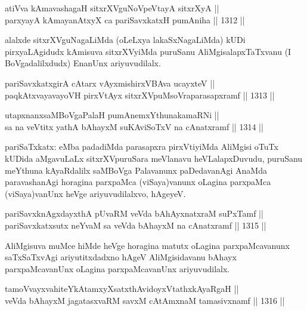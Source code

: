 \begin{shl}
atiVva kAmavashagaH sitxrXVguNoVpeVtayA sitxrXyA || \\
parxyayA kAmayanAtxyX ca pariSavxkatxH pumAniha \hfill || 1312 ||  
\end{shl}

\begin{artha}
alalxde sitxrXVguNagaLiMda (oLeLxya lakaSxNagaLiMda) kUDi pirxyaLAgidudx kAmisuva sitxrXVyiMda puruSanu AliMgisalapxTaTxvanu (I BoVgadalilxdudx) EnanUnx ariyuvudilalx.
\end{artha}


\begin{shl}
pariSavxkatxgirA cAtarx vAyxmishirxVBAva ucayxteV || \\
paqkAtxvayavayoVH pirxVtAyx sitxrXVpuMsoVraparasapxramf \hfill || 1313 ||  
\end{shl}
				
\begin{shl}
utapxnanxsaMBoVgaPalaH pumAnemxYthunakamaRNi || \\
sa na veVtitx yathA bAhayxM suKAviSoTxV na cA\s \s natxramf \hfill || 1314 ||  
\end{shl}

\begin{artha}
pariSaTxkatx: eMba padadiMda parasapxra pirxVtiyiMda AliMgisi oTuTx kUDida aMgavuLaLx sitxrXVpuruSara meVlanavu heVLalapxDuvudu, puruSanu meYthuna kAyaRdalilx saMBoVga Palavanunx paDedavanAgi AnaMda paravashanAgi horagina parxpaMca (viSaya)vanunx oLagina parxpaMca (viSaya)vanUnx heVge ariyuvudilalxvo, hAgeyeV.
\end{artha}

\begin{shl}
pariSavxknAgxdayxthA pUvaRM veVda bAhAyxnatxraM suPxTamf || \\
pariSavxkatxsutx neYvaM sa veVda bAhayxM na cA\s \s natxramf \hfill || 1315 ||  
\end{shl}

\begin{artha}
AliMgisuva muMce hiMde heVge horagina matutx oLagina parxpaMcavanunx saTxSaTxvAgi ariyutitxdadxno hAgeV AliMgisidavanu bAhayx parxpaMcavanUnx oLagina parxpaMcavanUnx ariyuvudilalx.
\end{artha}

\begin{shl}
tamoVvayxvahiteYkAtamxyXsatxthA\s vidoyxVtathxkAyaRgaH || \\
veVda bAhayxM jagatasxvaRM savxM cA\s \s tAmxnaM tamasivxnamf \hfill || 1316 ||  
\end{shl}

